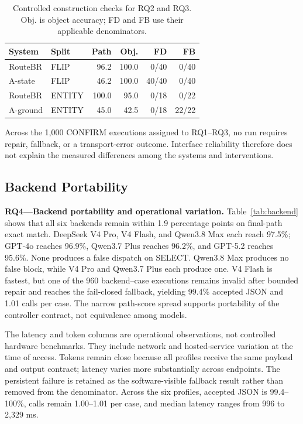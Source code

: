 \documentclass[10pt,conference,a4paper]{IEEEtran}
\newcommand{\method}{RouteBR}
\begin{document}
\begin{table}[!t]
\caption{Controlled construction checks for RQ2 and RQ3. Obj. is object accuracy; FD and FB use their applicable denominators.}
\label{tab:ablation}
\centering
\footnotesize
\setlength{\tabcolsep}{3.2pt}
\renewcommand{\arraystretch}{1.14}
\begin{tabular}{@{}llrrrr@{}}
\toprule
System & Split & Path & Obj. & FD & FB \\
\midrule
\method{} & FLIP & 96.2 & 100.0 & 0/40 & 0/40 \\
A-state & FLIP & 46.2 & 100.0 & 40/40 & 0/40 \\
\method{} & ENTITY & 100.0 & 95.0 & 0/18 & 0/22 \\
A-ground & ENTITY & 45.0 & 42.5 & 0/18 & 22/22 \\
\bottomrule
\end{tabular}
\end{table}

Across the 1,000 CONFIRM executions assigned to RQ1--RQ3, no run requires repair, fallback, or a transport-error outcome. Interface reliability therefore does not explain the measured differences among the systems and interventions.

\subsection{Backend Portability}

\noindent\textbf{RQ4---Backend portability and operational variation.}
Table~\ref{tab:backend} shows that all six backends remain within 1.9 percentage points on final-path exact match. DeepSeek V4 Pro, V4 Flash, and Qwen3.8 Max each reach 97.5\%; GPT-4o reaches 96.9\%, Qwen3.7 Plus reaches 96.2\%, and GPT-5.2 reaches 95.6\%. None produces a false dispatch on SELECT. Qwen3.8 Max produces no false block, while V4 Pro and Qwen3.7 Plus each produce one. V4 Flash is fastest, but one of the 960 backend--case executions remains invalid after bounded repair and reaches the fail-closed fallback, yielding 99.4\% accepted JSON and 1.01 calls per case. The narrow path-score spread supports portability of the controller contract, not equivalence among models.

The latency and token columns are operational observations, not controlled hardware benchmarks. They include network and hosted-service variation at the time of access. Tokens remain close because all profiles receive the same payload and output contract; latency varies more substantially across endpoints. The persistent failure is retained as the software-visible fallback result rather than removed from the denominator. Across the six profiles, accepted JSON is 99.4--100\%, calls remain 1.00--1.01 per case, and median latency ranges from 996 to 2,329 ms.
\end{document}
